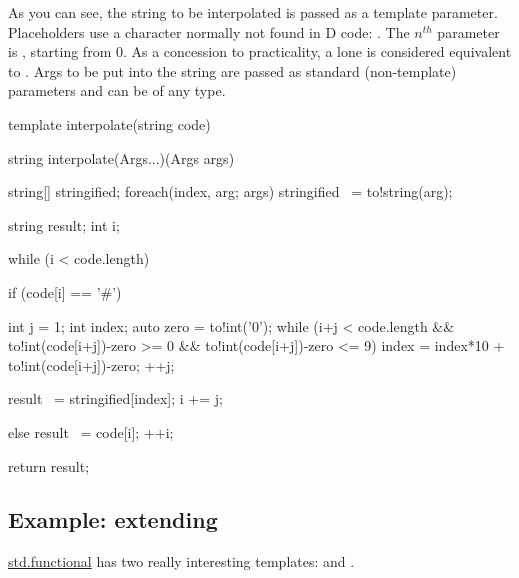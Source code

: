 As you can see, the string to be interpolated is passed as a template parameter. Placeholders use a character normally not found in D code: \DD{\#}. The $n^{th}$ parameter is , starting from 0. As a concession to practicality, a lone \DD{\#} is considered equivalent to . Args to be put into the string are passed as standard (non-template) parameters and can be of any type.

\begin{dcode}
template interpolate(string code)
{
    string interpolate(Args...)(Args args) {
        string[] stringified;
        foreach(index, arg; args) stringified ~= to!string(arg);

        string result;
        int i;

        while (i < code.length) {
            if (code[i] == '#') {
                int j = 1;
                int index;
                auto zero = to!int('0');
                while (i+j < code.length
                    && to!int(code[i+j])-zero >= 0
                    && to!int(code[i+j])-zero <= 9)
                {
                    index = index*10 + to!int(code[i+j])-zero;
                    ++j;
                }

                result ~= stringified[index];
                i += j;
            }
            else {
                result ~= code[i];
                ++i;
            }
        }

        return result;
    }
}
\end{dcode}


\subsection{Example: extending }\label{naryfun}

\href{www.d-programming-language.org/phobos/std_functional.html}{std.functional} has two really interesting templates:  and .


